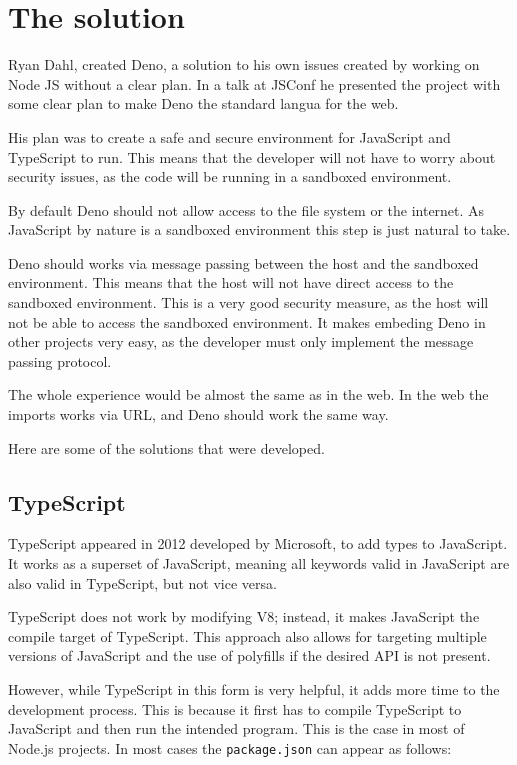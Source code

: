 \documentclass[10pt,journal,compsoc]{IEEEtran}
\begin{document}
\section{The solution}

Ryan Dahl, created Deno, a solution to his own issues created by working on Node JS without a clear plan. In a talk at JSConf \cite{FKNODE} he presented the project with some clear plan to make Deno the standard langua for the web.

His plan was to create a safe and secure environment for JavaScript and TypeScript to run. This means that the developer will not have to worry about security issues, as the code will be running in a sandboxed environment.

By default Deno should not allow access to the file system or the internet. As JavaScript by nature is a sandboxed environment this step is just natural to take.

Deno should works via message passing between the host and the sandboxed environment. This means that the host will not have direct access to the sandboxed environment. This is a very good security measure, as the host will not be able to access the sandboxed environment. It makes embeding Deno in other projects very easy, as the developer must only implement the message passing protocol.

The whole experience would be almost the same as in the web. In the web the imports works via URL, and Deno should work the same way.

Here are some of the solutions that were developed.

\subsection{TypeScript}

TypeScript appeared in 2012 developed by Microsoft, to add types to JavaScript. It works as a superset of JavaScript, meaning all keywords valid in JavaScript are also valid in TypeScript, but not vice versa. \cite{TypeScript}

TypeScript does not work by modifying V8; instead, it makes JavaScript the compile target of TypeScript. This approach also allows for targeting multiple versions of JavaScript and the use of polyfills \cite{Polyfill} if the desired API is not present.

However, while TypeScript in this form is very helpful, it adds more time to the development process. This is because it first has to compile TypeScript to JavaScript and then run the intended program. This is the case in most of Node.js projects. In most cases the \verb|package.json| can appear as follows:
\end{document}
